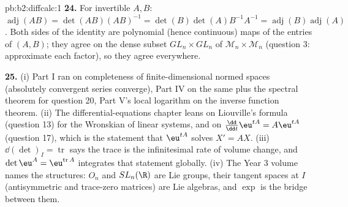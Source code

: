 \begin{solution}{pb:b2:diffcalc:1}
\textbf{24.} For invertible $A, B$: $\operatorname{adj}(AB) =
\det(AB)(AB)^{-1} = \det(B)\det(A)B^{-1}A^{-1} =
\operatorname{adj}(B)\operatorname{adj}(A)$. Both sides of the
identity are polynomial (hence continuous) maps of the entries
of $(A, B)$; they agree on the dense subset $GL_n\times GL_n$
of $\mathcal M_n\times\mathcal M_n$ (question 3: approximate
each factor), so they agree everywhere.

\textbf{25.} (i) Part I ran on completeness of finite-dimensional
normed spaces (absolutely convergent series converge), Part IV
on the same plus the spectral theorem for question 20, Part V's
local logarithm on the inverse function theorem. (ii) The
differential-equations chapter leans on Liouville's formula
(question 13) for the Wronskian of linear systems, and on
$\frac{\dd}{\dd t}\eu^{tA} = A\eu^{tA}$ (question 17), which is
the statement that $\eu^{tA}$ solves $X' = AX$. (iii)
$\dd(\det)_I = \operatorname{tr}$ says the trace is the
infinitesimal rate of volume change, and $\det\eu^A =
\eu^{\operatorname{tr}A}$ integrates that statement globally.
(iv) The Year 3 volume names the structures: $O_n$ and
$SL_n(\R)$ are Lie groups, their tangent spaces at $I$
(antisymmetric and trace-zero matrices) are Lie algebras, and
$\exp$ is the bridge between them.
\end{solution}

